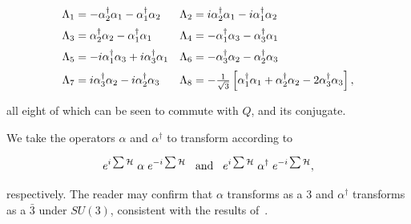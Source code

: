 \documentclass[letterpaper,12pt,titlepage,oneside,final]{book}
\newcommand{\spacer}{0.2cm}
\begin{document}
\begin{equation}\begin{array}{ll}\label{liealg}
\Lambda_1= -\alpha_2^{\dagger}\alpha_1    -\alpha_1^{\dagger}\alpha_2           &                \Lambda_2=i\alpha_2^{\dagger}\alpha_1 -i\alpha_1^{\dagger}\alpha_2       \vspace{\spacer}\\
\Lambda_3=\alpha_2^{\dagger}\alpha_2  -\alpha_1^{\dagger}\alpha_1
& \Lambda_4=-\alpha_1^{\dagger}\alpha_3-\alpha_3^{\dagger}\alpha_1        \vspace{\spacer}
\\ \Lambda_5=-i\alpha_1^{\dagger}\alpha_3 +i\alpha_3^{\dagger}\alpha_1& \Lambda_6=-\alpha_3^{\dagger}\alpha_2-\alpha_2^{\dagger}\alpha_3
\vspace{\spacer}
\\ \Lambda_7=i\alpha_3^{\dagger}\alpha_2-i\alpha_2^{\dagger}\alpha_3 & \Lambda_8=  -\frac{1}{\sqrt{3}}\left[\alpha_1^{\dagger}\alpha_1  + \alpha_2^{\dagger}\alpha_2  -2\alpha_3^{\dagger}\alpha_3\right],
\end{array}\end{equation}

\noindent all eight of which can be seen to commute with $Q$, and its conjugate.  

 
We take the operators $\alpha$ and $\alpha^{\dagger}$ to transform according to

\begin{equation}\label{transf}
e^{i\sum\mathcal{H}} \hspace{1mm}\alpha \hspace{1mm}e^{-i\sum\mathcal{H}}\hspace{3mm} \textup{and} \hspace{3mm} e^{i\sum\mathcal{H}} \hspace{1mm}\alpha^{\dagger} \hspace{1mm}e^{-i\sum\mathcal{H}},
\end{equation}

\noindent respectively.  The reader may confirm that $\alpha$ transforms as a $3$ and $\alpha^{\dagger}$ transforms as a $\bar{3}$ under $SU(3)$,  consistent with the results of~\cite{GGstats}.
\end{document}
